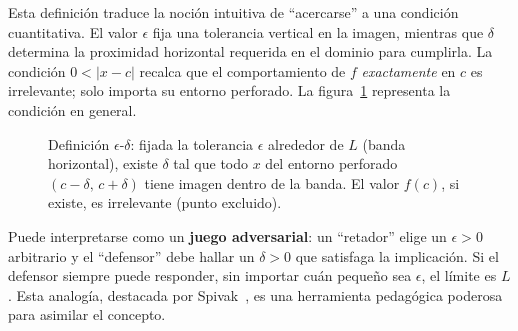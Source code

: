 Esta definición traduce la noción intuitiva de ``acercarse'' a una condición
cuantitativa. El valor $\epsilon$ fija una tolerancia vertical en la imagen,
mientras que $\delta$ determina la proximidad horizontal requerida en el dominio
para cumplirla. La condición $0<|x-c|$ recalca que el comportamiento de $f$
\emph{exactamente} en $c$ es irrelevante; solo importa su entorno perforado.
La figura~\ref{fig:limite_epsilon_delta} representa la condición en general.

\begin{figure}[!htbp]
\centering
{}
\caption{Definición $\epsilon$-$\delta$: fijada la tolerancia $\epsilon$
alrededor de $L$ (banda horizontal), existe $\delta$ tal que todo $x$ del
entorno perforado $(c-\delta,\,c+\delta)$ tiene imagen dentro de la banda.
El valor $f(c)$, si existe, es irrelevante (punto excluido).}
\label{fig:limite_epsilon_delta}
\end{figure}

\begin{rem}
Puede interpretarse como un \textbf{juego adversarial}: un ``retador'' elige
un $\epsilon>0$ arbitrario y el ``defensor'' debe hallar un $\delta>0$ que
satisfaga la implicación. Si el defensor siempre puede responder, sin importar
cuán pequeño sea $\epsilon$, el límite es $L$. Esta analogía, destacada por
Spivak~\cite{spivak2012calculus}, es una herramienta pedagógica poderosa para
asimilar el concepto.
\end{rem}

